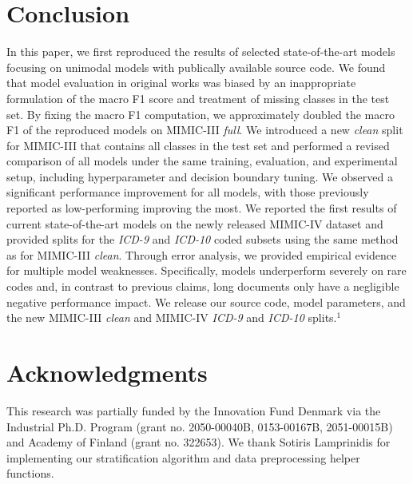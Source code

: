 {\section{Conclusion}
In this paper, we first reproduced the results of selected state-of-the-art models focusing on unimodal models with publically available source code. 
We found that model evaluation in original works was biased by an inappropriate formulation of the macro F1 score and treatment of missing classes in the test set. By fixing the macro F1 computation, we approximately doubled the macro F1 of the reproduced models on MIMIC-III \textit{full}. 
We introduced a new \textit{clean} split for MIMIC-III that contains all classes in the test set and performed a revised comparison of all models under the same training, evaluation, and experimental setup, including hyperparameter and decision boundary tuning. We observed a significant performance improvement for all models, with those previously reported as low-performing improving the most. 
We reported the first results of current state-of-the-art models on the newly released MIMIC-IV dataset \cite{johnsonMIMICIVFreelyAccessible2023, goldbergerPhysioBankPhysioToolkitPhysioNet2000} and provided splits for the \textit{ICD-9} and \textit{ICD-10} coded subsets using the same method as for MIMIC-III \textit{clean}.
Through error analysis, we provided empirical evidence for multiple model weaknesses. Specifically, models underperform severely on rare codes 
and, in contrast to previous claims, long documents only have a negligible negative performance impact. 
We release our source code, model parameters, and the new MIMIC-III \textit{clean} and MIMIC-IV \textit{ICD-9} and \textit{ICD-10} splits.$^\text{1}$

\section*{Acknowledgments}
This research was partially funded by the Innovation Fund Denmark via the Industrial Ph.D. Program (grant no. 2050-00040B, 0153-00167B, 2051-00015B) and Academy of Finland (grant no. 322653).
We thank Sotiris Lamprinidis for implementing our stratification algorithm and data preprocessing helper functions.
   
}
